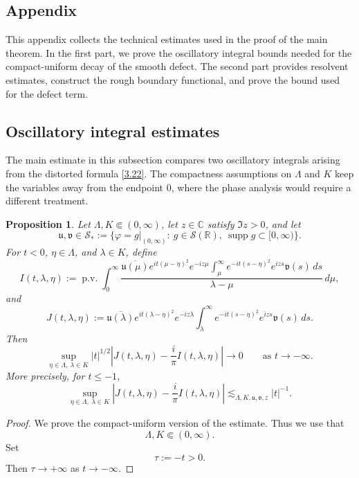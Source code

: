 \documentclass[10pt]{article}
\newtheorem{proposition}[theorem]{Proposition}
\numberwithin{equation}{section}
\numberwithin{theorem}{section}
\begin{document}
\begin{appendix}
\section{Appendix}
\label{appendix}
This appendix collects the technical estimates used in the proof of the main theorem. In the first part, we  prove the oscillatory
integral bounds needed for the compact-uniform decay of the smooth defect. The second part provides resolvent estimates, construct the rough boundary functional, and prove the bound used for the defect term.

\subsection{Oscillatory integral estimates}

The main estimate in this subsection compares two oscillatory integrals arising from the
distorted formula \eqref{3.22}. The compactness assumptions on
\(\Lambda\) and \(K\) keep the variables away from the endpoint \(0\), where the phase
analysis would require a different treatment.
\begin{proposition}
\label{prop a.3}
Let \(\Lambda,K\Subset(0,\infty)\), let \(z\in\mathbb C\) satisfy
\(\Im z>0\), and let
\[
\mathfrak u,\mathfrak v\in\mathcal{S}_{*}:=\{\varphi=g|_{(0,\infty)}:\ g\in \mathcal{S}(\mathbb R),\
\operatorname{supp}g\subset[0,\infty)\}.
\]
For \(t<0\), \(\eta\in\Lambda\), and \(\lambda\in K\), define
\[
I(t,\lambda,\eta)
:=
\operatorname{p.v.}\int_0^\infty
\frac{\overline{\mathfrak u(\mu)}e^{it(\mu-\eta)^2}e^{-iz\mu}
\displaystyle\int_\mu^\infty e^{-it(s-\eta)^2}e^{izs}\mathfrak v(s)\,ds}
{\lambda-\mu}\,d\mu,
\]
and
\[
J(t,\lambda,\eta)
:=
\overline{\mathfrak u(\lambda)}e^{it(\lambda-\eta)^2}e^{-iz\lambda}
\int_\lambda^\infty e^{-it(s-\eta)^2}e^{izs}\mathfrak v(s)\,ds.
\]
Then
\[
\sup_{\eta\in\Lambda,\ \lambda\in K}
|t|^{1/2}\left|J(t,\lambda,\eta)-\frac{i}{\pi}I(t,\lambda,\eta)\right|
\longrightarrow 0
\qquad\text{as }t\to-\infty.
\]
More precisely, for \(t\le -1\),
\[
\sup_{\eta\in\Lambda,\ \lambda\in K}
\left|J(t,\lambda,\eta)-\frac{i}{\pi}I(t,\lambda,\eta)\right|
\lesssim_{\Lambda,K,\mathfrak u,\mathfrak v,z} |t|^{-1}.
\]
\end{proposition}

\begin{proof}
We prove the compact-uniform version of the estimate. Thus we use that
\[
\Lambda,K\Subset(0,\infty).
\]
Set
\[
\tau:=-t>0.
\]
Then \(\tau\to+\infty\) as \(t\to-\infty\).


\end{proof}
\end{appendix}
\end{document}
